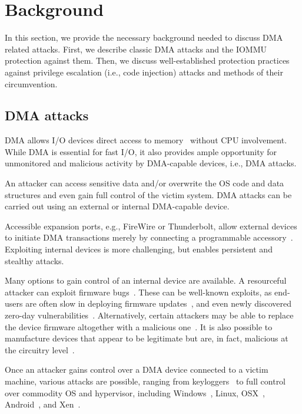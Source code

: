 \section{Background}\label{sec:background}

In this section, we provide the necessary background needed to discuss DMA related attacks. First, we describe classic DMA attacks and the IOMMU protection against them. Then, we discuss well-established protection practices against privilege escalation (i.e., code injection) attacks and methods of their circumvention.

\subsection{DMA attacks}

DMA allows I/O devices direct access to memory~\cite{oC54} without CPU involvement. While DMA is essential for fast I/O, it also provides ample opportunity for unmonitored and malicious activity by DMA-capable devices, i.e., DMA attacks. 

An attacker can access sensitive data and/or overwrite the OS code and data structures and even gain full control of the victim system. DMA attacks can be carried out using an external or internal DMA-capable device. 

Accessible expansion ports, e.g., FireWire or Thunderbolt, allow external devices to initiate DMA transactions merely by connecting a programmable accessory~\cite{Dor04, Vol, MM, thunder}. 
Exploiting internal devices is more challenging, but enables persistent and stealthy attacks. 

Many options to gain control of an internal device are available.
A resourceful attacker can exploit firmware bugs~\cite{SB12}. These can be well-known exploits, as end-users are often slow in deploying firmware updates~\cite{DPVL10}, and even newly discovered zero-day vulnerabilities~\cite{Ben17b}. Alternatively, certain attackers may be able to replace the device firmware altogether with a malicious one~\cite{ZKB13, NL14}. It is also possible to manufacture devices that appear to be legitimate but are, in fact, malicious at the circuitry level~\cite{YHD16}.

Once an attacker gains control over a DMA device connected to a victim machine, various attacks are possible, ranging from keyloggers~\cite{LKV13, SB12} to full control over commodity OS and hypervisor, including Windows~\cite{AD10,thunder}, Linux, OSX~\cite{Fri16, thunder}, Android~\cite{Ben17b}, and Xen~\cite{Woj08}.

